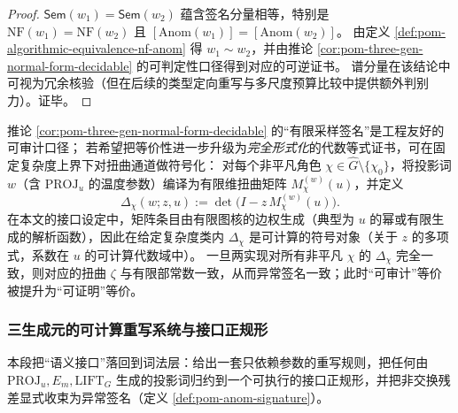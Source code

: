 \begin{proof}
\(\mathsf{Sem}(w_1)=\mathsf{Sem}(w_2)\) 蕴含签名分量相等，特别是 \(\mathrm{NF}(w_1)=\mathrm{NF}(w_2)\) 且 \([\mathrm{Anom}(w_1)]=[\mathrm{Anom}(w_2)]\)。
由定义 \ref{def:pom-algorithmic-equivalence-nf-anom} 得 \(w_1\sim w_2\)，并由推论 \ref{cor:pom-three-gen-normal-form-decidable} 的可判定性口径得到对应的可逆证书。
谱分量在该结论中可视为冗余核验（但在后续的类型定向重写与多尺度预算比较中提供额外判别力）。证毕。
\end{proof}

\begin{remark}\label{rem:pom-anom-symbolic-certificate}
推论 \ref{cor:pom-three-gen-normal-form-decidable} 的“有限采样签名”是工程友好的可审计口径；
若希望把等价性进一步升级为\emph{完全形式化}的代数等式证书，可在固定复杂度上界下对扭曲通道做符号化：
对每个非平凡角色 \(\chi\in\widehat G\setminus\{\chi_0\}\)，将投影词 \(w\)（含 \(\mathrm{PROJ}_u\) 的温度参数）编译为有限维扭曲矩阵 \(M_{\chi}^{(w)}(u)\)，并定义
\[
\Delta_\chi(w;z,u):=\det\bigl(I-z\,M_{\chi}^{(w)}(u)\bigr).
\]
在本文的接口设定中，矩阵条目由有限图核的边权生成（典型为 \(u\) 的幂或有限生成的解析函数），因此在给定复杂度类内 \(\Delta_\chi\) 是可计算的符号对象（关于 \(z\) 的多项式，系数在 \(u\) 的可计算代数域中）。
一旦两实现对所有非平凡 \(\chi\) 的 \(\Delta_\chi\) 完全一致，则对应的扭曲 \(\zeta\) 与有限部常数一致，从而异常签名一致；此时“可审计”等价被提升为“可证明”等价。
\end{remark}

\subsubsection{三生成元的可计算重写系统与接口正规形}\label{subsec:pom-three-gen-rewrite-normal}

本段把“语义接口”落回到词法层：给出一套只依赖参数的重写规则，把任何由
\(\mathrm{PROJ}_u,E_m,\mathrm{LIFT}_G\)
生成的投影词归约到一个可执行的接口正规形，并把非交换残差显式收束为异常签名（定义 \ref{def:pom-anom-signature}）。

